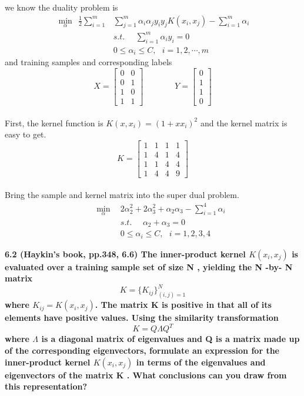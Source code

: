 \noindent we know the duality problem is
\begin{align}
\min\limits_{\alpha}~~ \frac{1}{2}\sum_{i=1}^{m}&\sum_{j=1}^{m}\alpha_i\alpha_jy_iy_jK(x_i,x_j)-\sum_{i=1}^{m}\alpha_i\nonumber\\
&s.t.~~~~~~\sum_{i=1}^{m}\alpha_iy_i = 0\nonumber\\
&0\leq\alpha_i\leq C,~~~i=1,2,\cdots,m \nonumber
\end{align}
and training samples and corresponding labels
$$X = \begin{bmatrix}
      0 & 0 \\
      0 & 1 \\
      1 & 0 \\
      1 & 1
    \end{bmatrix}~~~~~~~~~~~~~~~~~
Y = \begin{bmatrix}
      0 \\
      1 \\
      1 \\
      0
    \end{bmatrix}$$\\
First, the kernel function is $K(x,x_i)=(1+xx_i)^2$ and the kernel matrix is easy to get.
$$K =\begin{bmatrix}
       1 & 1 & 1 & 1 \\
       1 & 4 & 1 & 4 \\
       1 & 1 & 4 & 4 \\
       1 & 4 & 4 & 9
     \end{bmatrix}$$\\
Bring the sample and kernel matrix into the super dual problem.
\begin{align}
~~~~~~~~~\min\limits_{\alpha}~~ &2\alpha_2^2+2\alpha_3^2+\alpha_2\alpha_3-\sum_{i=1}^{4}\alpha_i\nonumber\\
&s.t.~~~~~~\alpha_2+\alpha_3 = 0\nonumber\\
&0\leq\alpha_i\leq C,~~~i=1,2,3,4 \nonumber
\end{align}

\newpage
\noindent\textbf{6.2 (Haykin’s book, pp.348, 6.6) The inner-product kernel $K(x_i,x_j)$ is evaluated over a training sample
set of size N , yielding the N -by- N matrix
$$K = \{K_{ij}\}^N_{(i,j)=1}$$
where $K_{ij}=K(x_i,x_j)$. The matrix K is positive in that all of its elements have positive values. Using
the similarity transformation
$$K = Q\Lambda Q^T$$
where $\Lambda$ is a diagonal matrix of eigenvalues and Q is a matrix made up of the corresponding
eigenvectors, formulate an expression for the inner-product kernel $K(x_i,x_j)$ in terms of the eigenvalues
and eigenvectors of the matrix K . What conclusions can you draw from this representation?}

